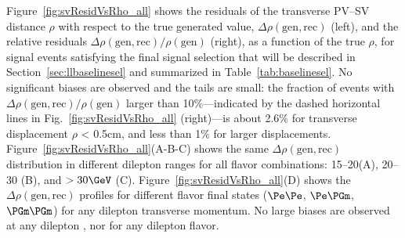 \vspace{5cm}
Figure~\ref{fig:svResidVsRho_all} shows the residuals of the
transverse PV--SV distance $\rho$ with respect to the true generated
value, $\Delta\rho(\mathrm{gen,rec})$ (left), and the relative residuals
$\Delta\rho(\mathrm{gen,rec})/\rho(\mathrm{gen})$ (right), as a
function of the true $\rho$, for signal events satisfying the final
signal selection that will be described in
Section~\ref{sec:llbaselinesel} and summarized in
Table~\ref{tab:baselinesel}. No significant biases are observed and
the tails are small: the fraction of events with
$\Delta\rho(\mathrm{gen,rec})/\rho(\mathrm{gen})$ larger than
10\%---indicated by the dashed horizontal lines in
Fig.~\ref{fig:svResidVsRho_all} (right)---is about 2.6\% for
transverse displacement $\rho$ < 0.5cm, and less than 1\% for larger
displacements.
Figure~\ref{fig:svResidVsRho_all}(A-B-C) shows the same
$\Delta\rho(\mathrm{gen,rec})$ distribution in different dilepton \pt
ranges for all flavor combinations: 15--20\GeV (A), 20--30\GeV
(B), and $>30\GeV$ (C).
Figure~\ref{fig:svResidVsRho_all}(D) shows the
$\Delta\rho(\mathrm{gen,rec})$ profiles for different flavor final
states ($\Pe\Pe$, $\Pe\PGm$, $\PGm\PGm$) for any dilepton transverse
momentum.
No large biases are observed at any dilepton \pt, nor for
any dilepton flavor.
